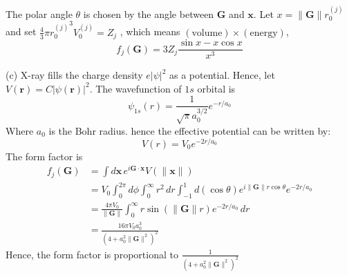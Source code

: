 \documentclass[a4paper,11pt]{article}
\begin{document}
The polar angle $\theta$ is chosen by the angle between $\mathbf G$ and $\mathbf x$. Let $x=\|\mathbf G\|r_0^{(j)}$
 and set $\frac{4}{3}\pi {r_0^{(j)}}^3 V_0^{(j)}=Z_{j}$ , which means $(\text{volume})\times(\text{energy})$,
\begin{equation}
    f_j(\mathbf G) = 3Z_j\frac{\sin x-x\cos x}{x^3}
\end{equation}

(c) X-ray fills the charge density $e|\psi|^2$ as a potential. Hence, let $V(\mathbf r)=C|\psi(\mathbf r)|^2$. The wavefunction of $1s$ orbital is
\begin{equation}
    \psi_{1s}(r)=\frac{1}{\sqrt{\pi}a_0^{3/2}}e^{-r/a_0}
\end{equation}
Where $a_0$ is the Bohr radius. hence the effective potential can be written by:
\begin{equation}
    V(r)=V_0e^{-2r/a_0}
\end{equation}
The form factor is
\begin{align}
    f_j(\mathbf G) 
    &= \int d\mathbf x\, e^{i\mathbf G\cdot\mathbf x}V(\|\mathbf x\|) \\
    &=V_0\int_0^{2\pi} d\phi\int_0^\infty r^2\, dr\int_{-1}^{1} d(\cos\theta) e^{i\|\mathbf G\|r\cos\theta}e^{-2r/a_0}\\
    &=\frac{4\pi V_0}{\|\mathbf G\|}\int_0^\infty r\sin(\|\mathbf G\|r) e^{-2r/a_0}\, dr\\
    &= \frac{16\pi V_0 a_0^3}{(4 + a_0^2\|\mathbf G\|^2)^2}
\end{align}
Hence, the form factor is proportional to $\frac{1}{(4 + a_0^2\|\mathbf G\|^2)^2}$
\end{document}
